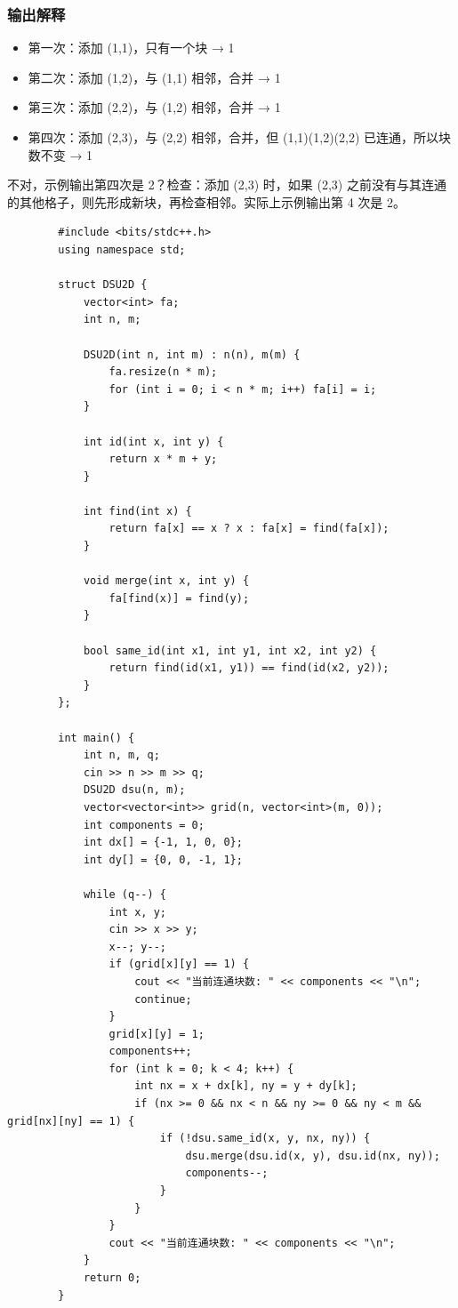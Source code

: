 \documentclass[12pt,a4paper]{ctexart}
\begin{document}
	\subsubsection*{输出解释}
	\begin{itemize}
		\item 第一次：添加 (1,1)，只有一个块 → 1
		\item 第二次：添加 (1,2)，与 (1,1) 相邻，合并 → 1
		\item 第三次：添加 (2,2)，与 (1,2) 相邻，合并 → 1
		\item 第四次：添加 (2,3)，与 (2,2) 相邻，合并，但 (1,1)(1,2)(2,2) 已连通，所以块数不变 → 1
	\end{itemize}
	不对，示例输出第四次是 2？检查：添加 (2,3) 时，如果 (2,3) 之前没有与其连通的其他格子，则先形成新块，再检查相邻。实际上示例输出第 4 次是 2。
	
	\begin{lstlisting}
		#include <bits/stdc++.h>
		using namespace std;
		
		struct DSU2D {
			vector<int> fa;
			int n, m;
			
			DSU2D(int n, int m) : n(n), m(m) {
				fa.resize(n * m);
				for (int i = 0; i < n * m; i++) fa[i] = i;
			}
			
			int id(int x, int y) {
				return x * m + y;
			}
			
			int find(int x) {
				return fa[x] == x ? x : fa[x] = find(fa[x]);
			}
			
			void merge(int x, int y) {
				fa[find(x)] = find(y);
			}
			
			bool same_id(int x1, int y1, int x2, int y2) {
				return find(id(x1, y1)) == find(id(x2, y2));
			}
		};
		
		int main() {
			int n, m, q;
			cin >> n >> m >> q;
			DSU2D dsu(n, m);
			vector<vector<int>> grid(n, vector<int>(m, 0));
			int components = 0;
			int dx[] = {-1, 1, 0, 0};
			int dy[] = {0, 0, -1, 1};
			
			while (q--) {
				int x, y;
				cin >> x >> y;
				x--; y--;
				if (grid[x][y] == 1) {
					cout << "当前连通块数: " << components << "\n";
					continue;
				}
				grid[x][y] = 1;
				components++;
				for (int k = 0; k < 4; k++) {
					int nx = x + dx[k], ny = y + dy[k];
					if (nx >= 0 && nx < n && ny >= 0 && ny < m && grid[nx][ny] == 1) {
						if (!dsu.same_id(x, y, nx, ny)) {
							dsu.merge(dsu.id(x, y), dsu.id(nx, ny));
							components--;
						}
					}
				}
				cout << "当前连通块数: " << components << "\n";
			}
			return 0;
		}
	\end{lstlisting}
	
\end{document}
